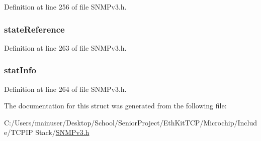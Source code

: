 Definition at line 256 of file S\+N\+M\+Pv3.\+h.

\hypertarget{structdispathcer_return_response_pdu_a62eef1407cf307242b77d068071cafeb}{}
\subsubsection[{state\+Reference}]{ state\+Reference}\label{structdispathcer_return_response_pdu_a62eef1407cf307242b77d068071cafeb}


Definition at line 263 of file S\+N\+M\+Pv3.\+h.

\hypertarget{structdispathcer_return_response_pdu_ad07540e94950d793173ffdb63915b853}{}
\subsubsection[{stat\+Info}]{ stat\+Info}\label{structdispathcer_return_response_pdu_ad07540e94950d793173ffdb63915b853}


Definition at line 264 of file S\+N\+M\+Pv3.\+h.



The documentation for this struct was generated from the following file\+:\begin{DoxyCompactItemize}
\item 
C\+:/\+Users/mainuser/\+Desktop/\+School/\+Senior\+Project/\+Eth\+Kit\+T\+C\+P/\+Microchip/\+Include/\+T\+C\+P\+I\+P Stack/\hyperlink{_s_n_m_pv3_8h}{S\+N\+M\+Pv3.\+h}\end{DoxyCompactItemize}
